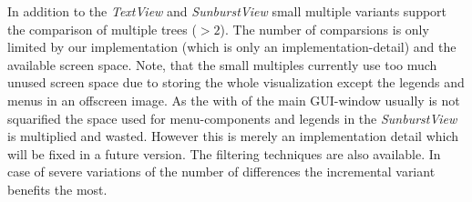 In addition to the \emph{TextView} and \emph{SunburstView} small multiple variants support the comparison of multiple trees ($> 2$). The number of comparsions is only limited by our implementation (which is only an implementation-detail) and the available screen space. Note, that the small multiples currently use too much unused screen space due to storing the whole visualization except the legends and menus in an offscreen image. As the with of the main GUI-window usually is not squarified the space used for menu-components and legends in the \emph{SunburstView} is multiplied and wasted. However this is merely an implementation detail which will be fixed in a future version. The filtering techniques are also available. In case of severe variations of the number of differences the incremental variant benefits the most.








